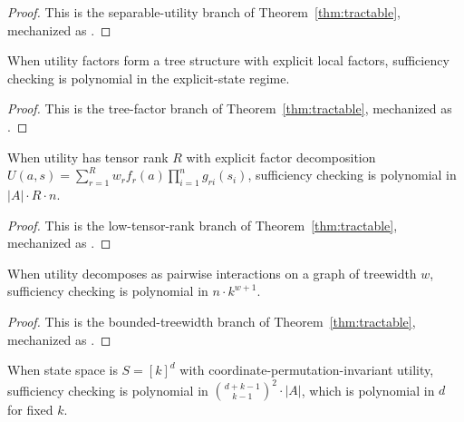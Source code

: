 \begin{proof}
This is the separable-utility branch of Theorem~\ref{thm:tractable}, mechanized as .
\end{proof}

\begin{corollary}\label{cor:practice-tree}
When utility factors form a tree structure with explicit local factors, sufficiency checking is polynomial in the explicit-state regime.
\end{corollary}

\begin{proof}
This is the tree-factor branch of Theorem~\ref{thm:tractable}, mechanized as .
\end{proof}

\begin{corollary}\label{cor:practice-tensor}
When utility has tensor rank $R$ with explicit factor decomposition $U(a,s) = \sum_{r=1}^R w_r f_r(a) \prod_{i=1}^n g_{ri}(s_i)$, sufficiency checking is polynomial in $|A| \cdot R \cdot n$.
\end{corollary}

\begin{proof}
This is the low-tensor-rank branch of Theorem~\ref{thm:tractable}, mechanized as .
\end{proof}

\begin{corollary}\label{cor:practice-treewidth}
When utility decomposes as pairwise interactions on a graph of treewidth $w$, sufficiency checking is polynomial in $n \cdot k^{w+1}$.
\end{corollary}

\begin{proof}
This is the bounded-treewidth branch of Theorem~\ref{thm:tractable}, mechanized as .
\end{proof}

\begin{corollary}\label{cor:practice-symmetry}
When state space is $S = [k]^d$ with coordinate-permutation-invariant utility, sufficiency checking is polynomial in $\binom{d+k-1}{k-1}^2 \cdot |A|$, which is polynomial in $d$ for fixed $k$.
\end{corollary}


